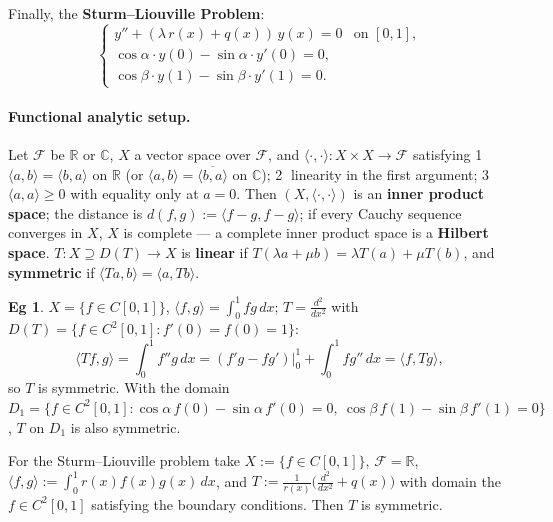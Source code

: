 \documentclass[11pt]{article}
\theoremstyle{definition}
\newtheorem*{example}{Eg}
\theoremstyle{remark}
\newcommand{\R}{\mathbb{R}}
\newcommand{\CC}{\mathbb{C}}
\begin{document}
Finally, the \textbf{Sturm--Liouville Problem}:
\[
\begin{cases} y''+(\lambda\,r(x)+q(x))\,y(x)=0 & \text{on } [0,1],\\ \cos\alpha\cdot y(0)-\sin\alpha\cdot y'(0)=0,\\ \cos\beta\cdot y(1)-\sin\beta\cdot y'(1)=0. \end{cases}
\]

\paragraph{Functional analytic setup.}
Let $\mathcal{F}$ be $\R$ or $\CC$, $X$ a vector space over $\mathcal{F}$, and
$\langle\cdot,\cdot\rangle: X\times X\to\mathcal{F}$ satisfying
\textcircled{1} $\langle a,b\rangle=\langle b,a\rangle$ on $\R$ (or
$\langle a,b\rangle=\overline{\langle b,a\rangle}$ on $\CC$);
\textcircled{2} linearity in the first argument;
\textcircled{3} $\langle a,a\rangle\ge0$ with equality only at $a=0$.
Then $(X,\langle\cdot,\cdot\rangle)$ is an \textbf{inner product space}; the distance is
$d(f,g):=\langle f-g,f-g\rangle$; if every Cauchy sequence converges in $X$, $X$ is complete --- a
complete inner product space is a \textbf{Hilbert space}. $T:X\supseteq D(T)\to X$ is \textbf{linear}
if $T(\lambda a+\mu b)=\lambda T(a)+\mu T(b)$, and \textbf{symmetric} if $\langle Ta,b\rangle=\langle a,Tb\rangle$.

\begin{example}
$X=\{f\in C[0,1]\}$, $\langle f,g\rangle=\int_0^1fg\,dx$; $T=\frac{d^2}{dx^2}$ with
$D(T)=\{f\in C^2[0,1]: f'(0)=f(0)=1\}$:
\[
\langle Tf,g\rangle=\int_0^1f''g\,dx=(f'g-fg')\big|_0^1+\int_0^1fg''\,dx=\langle f,Tg\rangle,
\]
so $T$ is symmetric. With the domain
$D_1=\{f\in C^2[0,1]: \cos\alpha\,f(0)-\sin\alpha\,f'(0)=0,\ \cos\beta\,f(1)-\sin\beta\,f'(1)=0\}$,
$T$ on $D_1$ is also symmetric.
\end{example}

For the Sturm--Liouville problem take $X:=\{f\in C[0,1]\}$, $\mathcal{F}=\R$,
$\langle f,g\rangle:=\int_0^1r(x)f(x)g(x)\,dx$, and
$T:=\frac{1}{r(x)}\bigl(\frac{d^2}{dx^2}+q(x)\bigr)$ with domain the $f\in C^2[0,1]$ satisfying the
boundary conditions. Then $T$ is symmetric.
\end{document}
